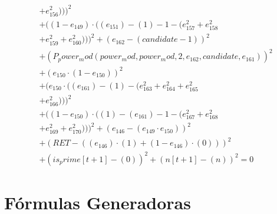 \documentclass[10pt, a4paper]{article}
\begin{document}
\begin{align*}
& + e_{156}^{2})))^{2} \\
& + ((1 - e_{149})  \cdot  ((e_{151}) - (1) - 1 - (e_{157}^{2} + e_{158}^{2} \\
& + e_{159}^{2} + e_{160}^{2})))^{2} + (e_{162} - (candidate - 1))^{2} \\
& + (P_power_mod(power_mod, power_mod, 2, e_{162}, candidate, e_{161}))^{2} \\
& + (e_{150}  \cdot  (1 - e_{150}))^{2} \\
& + (e_{150}  \cdot  ((e_{161}) - (1) - (e_{163}^{2} + e_{164}^{2} + e_{165}^{2} \\
& + e_{166}^{2})))^{2} \\
& + ((1 - e_{150})  \cdot  ((1) - (e_{161}) - 1 - (e_{167}^{2} + e_{168}^{2} \\
& + e_{169}^{2} + e_{170}^{2})))^{2} + (e_{146} - (e_{149}  \cdot  e_{150}))^{2} \\
& + (RET - ((e_{146})  \cdot  (1) + (1 - e_{146})  \cdot  (0)))^{2} \\
& + (is_prime[t+1] - (0))^{2} + (n[t+1] - (n))^{2} = 0
\end{align*}\part{Fórmulas Generadoras}
\end{document}
